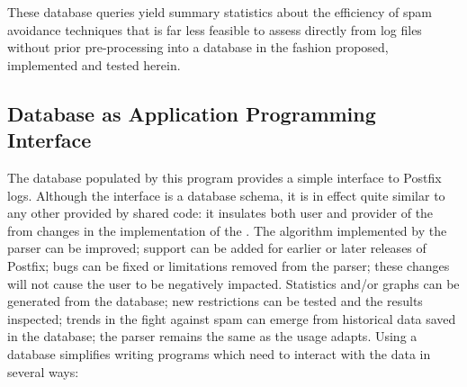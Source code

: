 \documentclass[a4paper,12pt,draft]{article}
\begin{document}
These database queries yield summary statistics about the efficiency of
spam avoidance techniques that is far less feasible to assess directly from
log files without prior pre-processing into a database in the fashion
proposed, implemented and tested herein.

\subsection{Database as Application Programming Interface}

The database populated by this program provides a simple interface to
Postfix logs.  Although the interface is a database schema, it is in effect
quite similar to any other \API{} provided by shared code: it insulates
both user and provider of the \API{} from changes in the implementation of
the \API{}\@.  The algorithm implemented by the parser can be improved;
support can be added for earlier or later releases of Postfix; bugs can be
fixed or limitations removed from the parser; these changes will not cause
the user to be negatively impacted.  Statistics and/or graphs can be
generated from the database; new restrictions can be tested and the results
inspected; trends in the fight against spam can emerge from historical data
saved in the database; the parser remains the same as the usage adapts.
Using a database simplifies writing programs which need to interact with
the data in several ways:
\end{document}
